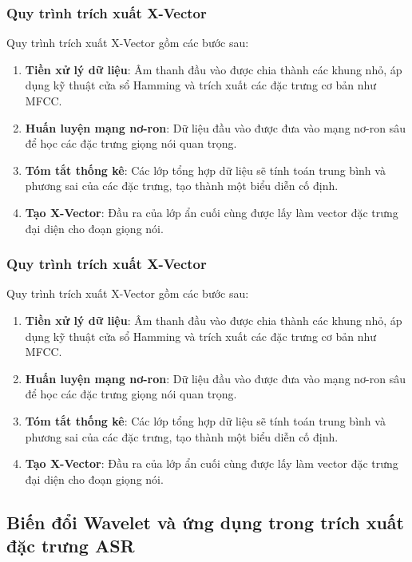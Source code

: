 \documentclass{article}
\begin{document}
\subsubsection{Quy trình trích xuất X-Vector}

Quy trình trích xuất X-Vector gồm các bước sau:

\begin{enumerate}
    \item \textbf{Tiền xử lý dữ liệu}: Âm thanh đầu vào được chia thành các khung nhỏ, áp dụng kỹ thuật cửa sổ Hamming và trích xuất các đặc trưng cơ bản như MFCC.
    \item \textbf{Huấn luyện mạng nơ-ron}: Dữ liệu đầu vào được đưa vào mạng nơ-ron sâu để học các đặc trưng giọng nói quan trọng.
    \item \textbf{Tóm tắt thống kê}: Các lớp tổng hợp dữ liệu sẽ tính toán trung bình và phương sai của các đặc trưng, tạo thành một biểu diễn cố định.
    \item \textbf{Tạo X-Vector}: Đầu ra của lớp ẩn cuối cùng được lấy làm vector đặc trưng đại diện cho đoạn giọng nói.
\end{enumerate}


\subsubsection{Quy trình trích xuất X-Vector}

Quy trình trích xuất X-Vector gồm các bước sau:

\begin{enumerate}
    \item \textbf{Tiền xử lý dữ liệu}: Âm thanh đầu vào được chia thành các khung nhỏ, áp dụng kỹ thuật cửa sổ Hamming và trích xuất các đặc trưng cơ bản như MFCC.
    \item \textbf{Huấn luyện mạng nơ-ron}: Dữ liệu đầu vào được đưa vào mạng nơ-ron sâu để học các đặc trưng giọng nói quan trọng.
    \item \textbf{Tóm tắt thống kê}: Các lớp tổng hợp dữ liệu sẽ tính toán trung bình và phương sai của các đặc trưng, tạo thành một biểu diễn cố định.
    \item \textbf{Tạo X-Vector}: Đầu ra của lớp ẩn cuối cùng được lấy làm vector đặc trưng đại diện cho đoạn giọng nói.
\end{enumerate}




\subsection{Biến đổi Wavelet và ứng dụng trong trích xuất đặc trưng ASR}
\end{document}
